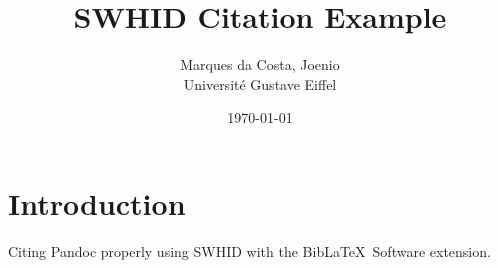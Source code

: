 \documentclass{article}
\title{
  SWHID Citation Example
}
\author{
  Marques da Costa, Joenio\\
  Université Gustave Eiffel
}
\date{\today}
\begin{document}
\maketitle

\section{Introduction}

Citing Pandoc \cite{MacFarlane_Pandoc} properly using SWHID
with the Bib\LaTeX \ Software extension\cite{softwareheritageorg_citing_2020}.

\printbibliography
\end{document}
